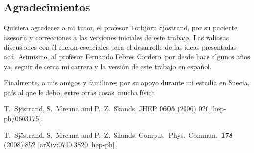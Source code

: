 \documentclass{tesisusb} %
\begin{document}

\begin{onehalfspace}

 \tableofcontents
 \listoffigures
\cuerpo %







%
%
%
%
%
%
%
%
%
%
%


\section*{Agradecimientos}

Quisiera agradecer a mi tutor, el profesor Torbjörn Sjöstrand, por su paciente asesoría y correcciones a las versiones iniciales de este trabajo. Las valiosas discusiones con él fueron esenciales para el desarrollo de las ideas presentadas acá. Asimismo, al profesor Fernando Febres Cordero, por desde hace algunos años ya, seguir de cerca mi carrera y la versión de este trabajo en español.

Finalmente, a mis amigos y familiares por su apoyo durante mi estadía en Suecia, país al que le debo, entre otras cosas, mucha física.


\clearpage
\begin{thebibliography}{99}


  T.~Sjöstrand, S.~Mrenna and P.~Z.~Skands,
  JHEP {\bf 0605} (2006) 026
  [hep-ph/0603175].

  T.~Sjöstrand, S.~Mrenna and P.~Z.~Skands,
  Comput.\ Phys.\ Commun.\  {\bf 178} (2008) 852
  [arXiv:0710.3820 [hep-ph]].
  

\end{thebibliography}
\end{onehalfspace}
\end{document}
